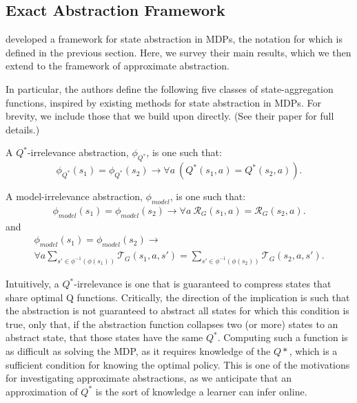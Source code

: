 
\subsection{Exact Abstraction Framework}

\citeauthor*{li2006towards} developed a framework for state abstraction in \acp{MDP}, the notation for which is defined in the previous section. Here, we survey their main results, which we then extend to the framework of approximate abstraction.

In particular, the authors define the following five classes of state-aggregation functions, inspired by existing methods for state abstraction in \acp{MDP}. For brevity, we include those that we build upon directly. (See their paper for full details.)

A $Q^*$-irrelevance abstraction, $\phi_{Q^*}$, is one such that:
\begin{equation}
\phi_{Q^*}(s_1) = \phi_{Q^*}(s_2) \rightarrow \forall a\ \left(Q^*(s_1,a) = Q^*(s_2,a)\right).
\end{equation}
\edefn

A model-irrelevance abstraction, $\phi_{model}$, is one such that:
\begin{multline}
\phi_{model}(s_1) = \phi_{model}(s_2) \rightarrow \forall a\ \mathcal{R}_G(s_1,a) = \mathcal{R}_G(s_2,a).
\end{multline}
and
\begin{multline}
\phi_{model}(s_1) = \phi_{model}(s_2) \rightarrow \\ \forall a \sum_{s' \in \phi^{-1}(\phi(s_1))} \mathcal{T}_G(s_1,a,s') = \sum_{s' \in \phi^{-1}(\phi(s_2))} \mathcal{T}_G(s_2,a,s').
\end{multline}
\edefn

Intuitively, a $Q^*$-irrelevance is one that is guaranteed to compress states that share optimal Q functions. Critically, the direction of the implication is such that the abstraction is not guaranteed to abstract all states for which this condition is true, only that, if the abstraction function collapses two (or more) states to an abstract state, that those states have the same $Q^*$. Computing such a function is as difficult as solving the MDP, as it requires knowledge of the $Q*$, which is a sufficient condition for knowing the optimal policy. This is one of the motivations for investigating approximate abstractions, as we anticipate that an approximation of $Q^*$ is the sort of knowledge a learner can infer online.

